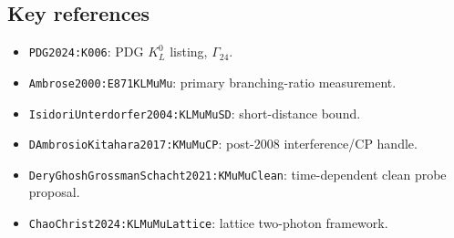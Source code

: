 \subsection*{Key references}
\begin{itemize}
\item \texttt{PDG2024:K006}: PDG \(K_L^0\) listing, \(\Gamma_{24}\).
\item \texttt{Ambrose2000:E871KLMuMu}: primary branching-ratio measurement.
\item \texttt{IsidoriUnterdorfer2004:KLMuMuSD}: short-distance bound.
\item \texttt{DAmbrosioKitahara2017:KMuMuCP}: post-2008 interference/CP handle.
\item \texttt{DeryGhoshGrossmanSchacht2021:KMuMuClean}: time-dependent clean probe proposal.
\item \texttt{ChaoChrist2024:KLMuMuLattice}: lattice two-photon framework.
\end{itemize}
